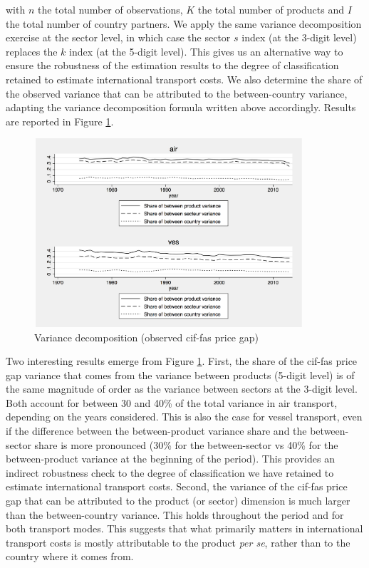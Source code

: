 \documentclass[a4paper,11pt]{article}
\begin{document}
\noindent with $n$ the total number of observations, $K$ the total number of products and $I$ the total number of country partners.
We apply the same variance decomposition exercise at the sector level, in which case the sector $s$ index (at the 3-digit level) replaces the $k$ index (at the 5-digit level).
This gives us an alternative way to ensure the robustness of the estimation results to the degree of classification retained to estimate international transport costs.
We also determine the share of the observed variance that can be attributed to the between-country variance, adapting the variance decomposition formula written above accordingly.
Results are reported in Figure \ref{fig:decomp_variance}.

\begin{figure}[htbp]
\caption{Variance decomposition (observed cif-fas price gap)}
\label{fig:decomp_variance}
\begin{center}
\includegraphics[width=10cm, height=7cm]{variance_decomposition.pdf}
\end{center}
\end{figure}


Two interesting results emerge from Figure \ref{fig:decomp_variance}.
First, the share of the cif-fas price gap variance that comes from the variance between products (5-digit level) is of the same magnitude of order as the variance between sectors at the 3-digit level.
Both account for between 30 and 40\% of the total variance in air transport, depending on the years considered.
This is also the case for vessel transport, even if the difference between the between-product variance share and the between-sector share is more pronounced (30\% for the between-sector vs 40\% for the between-product variance at the beginning of the period).
This provides an indirect robustness check to the degree of classification we have retained to estimate international transport costs.
Second, the variance of the cif-fas price gap that can be attributed to the product (or sector) dimension is much larger than the between-country variance.
This holds throughout the period and for both transport modes.
This suggests that what primarily matters in international transport costs is mostly attributable to the product \textit{per se}, rather than to the country where it comes from.
\end{document}
